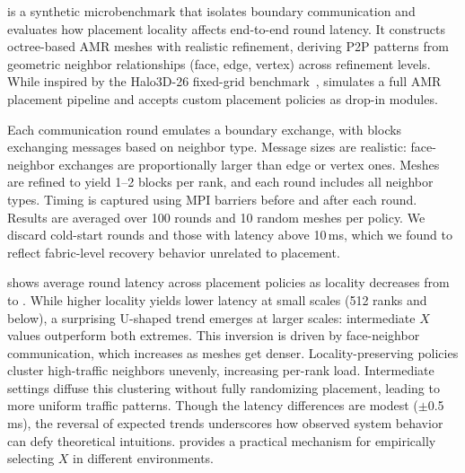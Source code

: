 \commbench{} is a synthetic microbenchmark that isolates boundary communication and
evaluates how placement locality affects end-to-end round latency.
It constructs octree-based AMR meshes with realistic refinement, deriving P2P patterns from
geometric neighbor relationships (face, edge, vertex) across refinement levels.
While inspired by the Halo3D-26 fixed-grid benchmark~\cite{Rodri2011:SST}, \commbench{} simulates
a full AMR placement pipeline and accepts custom placement policies as drop-in modules.

Each communication round emulates a boundary exchange, with blocks exchanging messages based on
neighbor type.
Message sizes are realistic: face-neighbor exchanges are proportionally larger than edge or vertex
ones.
Meshes are refined to yield 1--2 blocks per rank, and each round includes all neighbor types.
Timing is captured using MPI barriers before and after each round.
Results are averaged over 100 rounds and 10 random meshes per policy.
We discard cold-start rounds and those with latency above 10\,ms, which we found to reflect
fabric-level recovery behavior unrelated to placement.


 shows average round latency across placement policies as
locality decreases from \cpla{} to \cple.
While higher locality yields lower latency at small scales (512 ranks and below), a surprising
U-shaped trend emerges at larger scales: intermediate $X$ values outperform both extremes.
This inversion is driven by face-neighbor communication, which increases as meshes get denser.
Locality-preserving policies cluster high-traffic neighbors unevenly, increasing per-rank load.
Intermediate \cplx{} settings diffuse this clustering without fully randomizing placement, leading
to more uniform traffic patterns.
Though the latency differences are modest ($\pm$0.5\,ms), the reversal of expected trends
underscores how observed system behavior can defy theoretical intuitions.
\commbench{} provides a practical mechanism for empirically selecting $X$ in different environments.

